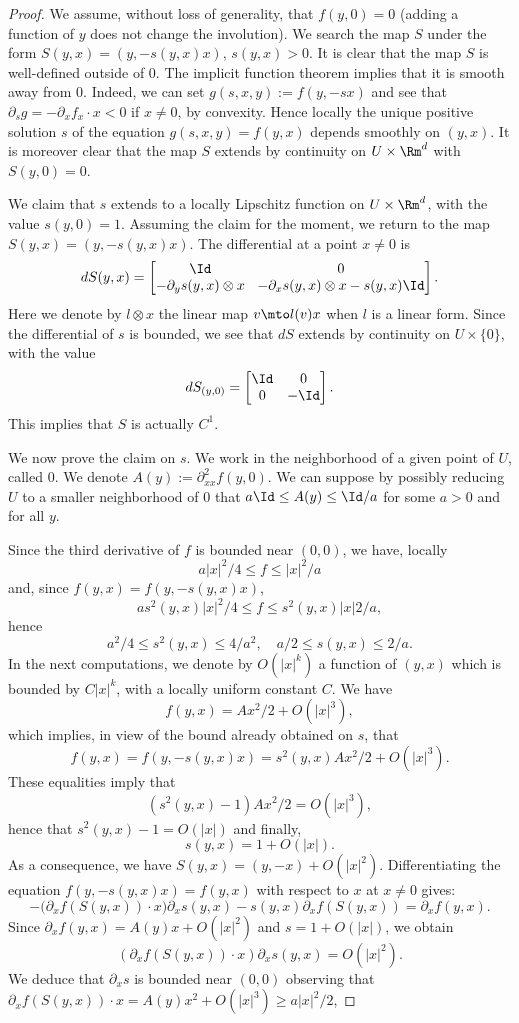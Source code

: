 \begin{proof}
We assume, without loss of generality, that $f(y,0)=0$ (adding a function of $y$ does not change the involution).
We search the map $S$ under the form $S(y,x)=(y,-s(y,x)x)$, $s(y,x)>0$.
It is clear that the map $S$ is well-defined outside of $0$. The implicit function theorem implies that it is smooth away from $0$. Indeed,
we can set $g(s,x,y):= f(y,-sx)$ and see that $\partial_sg=-\partial_xf_x\cdot x<0$ if $x\neq 0$, by convexity. Hence locally the unique positive solution $s$ of the equation $g(s,x,y)=f(y,x)$ depends smoothly on $(y,x)$.
It is moreover clear that the map $S$ extends by continuity on $U\times\Rm^d$ with $S(y,0)=0$.

\Changel

We claim that $s$ extends to a locally Lipschitz function on $U\times \Rm^d$, with the value $s(y,0)=1$.
Assuming the claim for the moment, we return to the map $S(y,x)=(y,-s(y,x)x)$. The differential at a point $x\neq 0$ is
\[\arraycolsep4.5pt
dS(y,x)=
\begin{bmatrix}
\Id&0\\ -\partial_ys(y,x) \otimes x & -\partial _x s(y,x)\otimes x-s(y,x) \Id
\end{bmatrix}.
\]
Here we denote by $l\otimes x$ the linear map $v\mto l(v)x$ when $l$ is a linear form. Since the differential of $s$ is bounded, we see that
$dS$ extends by continuity on $U\times \{0\}$, with the value
\[
dS_{(y,0)}=\begin{bmatrix} \Id & 0\\ 0 &-\Id\end{bmatrix}.\]
This implies that $S$ is actually $C^1$.

\Changelback

We now prove the claim on $s$. We work in the neighborhood of a given point of $U$, called $0$.
We denote $A(y):= \partial^2_{xx}f(y,0)$. We can suppose by possibly reducing $U$ to a smaller neighborhood of $0$ that $a \Id\leq A(y) \leq \Id/a$ for some $a>0$ and for all $y$.

Since the third derivative of $f$ is bounded near $(0,0)$, we have, locally
\[
a|x|^2/4\leq f\leq |x|^2/a
\]
and, since $f(y,x)=f(y,-s(y,x)x)$,
\[
as^2(y,x)|x|^2/4\leq f\leq s^2(y,x)|x|2/a,
\]
hence
\[
a^2/4\leq s^2(y,x)\leq 4/a^2,\quad
a/2\leq s(y,x)\leq 2/a.
\]
In the next computations, we denote by $O(|x|^k)$ a function of $(y,x)$ which is bounded by $C|x|^k$, with a locally uniform
constant $C$.
We have
\[
f(y,x)=Ax^2/2+O(|x|^3),
\]
which implies, in view of the bound already obtained on $s$, that
\[
f(y,x)=f(y,-s(y,x)x)=s^2(y,x)Ax^2/2+O(|x|^3).
\]
These equalities imply that
\[
(s^2(y,x)-1)Ax^2/2=O(|x|^3),
\]
hence that
$
s^2(y,x)-1=O(|x|)
$
and finally,
\[
s(y,x)=1+O(|x|).
\]
As a consequence, we have $S(y,x)=(y,-x)+O(|x|^2)$.
Differentiating the equation
$f(y,-s(y,x)x)=f(y,x)$
with respect to $x$ at $x\neq 0$ gives:
\[
-\big(\partial_xf(S(y,x))\cdot x \big) \partial_x s(y,x)-s(y,x) \partial_x f(S(y,x))=\partial_x f(y,x).
\]
Since $
\partial_x f(y,x)=A(y)x+O(|x|^2)
$
and $s=1+O(|x|)$, we obtain
\[
(\partial_xf({S(y,x)})\cdot x ) \partial_x s(y,x)=O(|x|^2).
\]
We deduce that $\partial_x s$ is bounded near $(0,0)$ observing that
$\partial_xf({S(y,x)})\cdot x=A(y)x^2+O(|x|^3)\geq a|x|^2/2$,


\end{proof}
